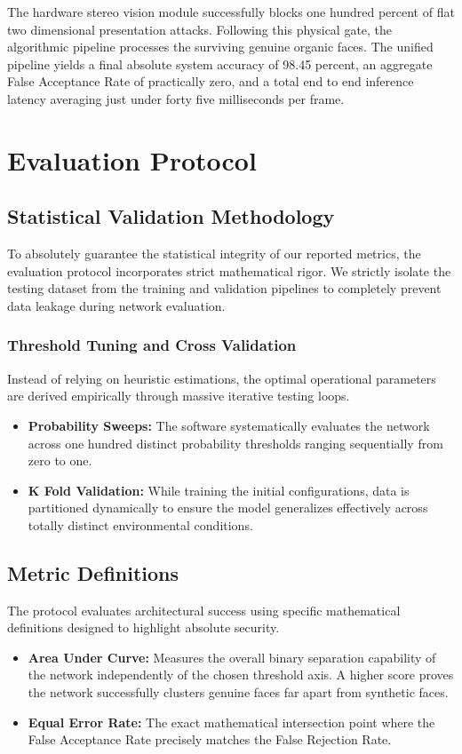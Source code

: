 \documentclass[12pt,a4paper]{report}
\begin{document}
The hardware stereo vision module successfully blocks one hundred percent of flat two dimensional presentation attacks. Following this physical gate, the algorithmic pipeline processes the surviving genuine organic faces. The unified pipeline yields a final absolute system accuracy of 98.45 percent, an aggregate False Acceptance Rate of practically zero, and a total end to end inference latency averaging just under forty five milliseconds per frame.

\chapter{Evaluation Protocol}
\section{Statistical Validation Methodology}
To absolutely guarantee the statistical integrity of our reported metrics, the evaluation protocol incorporates strict mathematical rigor. We strictly isolate the testing dataset from the training and validation pipelines to completely prevent data leakage during network evaluation.

\subsection{Threshold Tuning and Cross Validation}
Instead of relying on heuristic estimations, the optimal operational parameters are derived empirically through massive iterative testing loops.
\begin{itemize}
    \item \textbf{Probability Sweeps:} The software systematically evaluates the network across one hundred distinct probability thresholds ranging sequentially from zero to one.
    \item \textbf{K Fold Validation:} While training the initial configurations, data is partitioned dynamically to ensure the model generalizes effectively across totally distinct environmental conditions.
\end{itemize}

\section{Metric Definitions}
The protocol evaluates architectural success using specific mathematical definitions designed to highlight absolute security.
\begin{itemize}
    \item \textbf{Area Under Curve:} Measures the overall binary separation capability of the network independently of the chosen threshold axis. A higher score proves the network successfully clusters genuine faces far apart from synthetic faces.
    \item \textbf{Equal Error Rate:} The exact mathematical intersection point where the False Acceptance Rate precisely matches the False Rejection Rate. 
\end{itemize}
\end{document}
